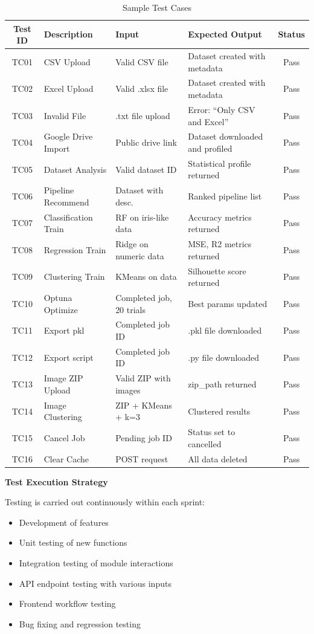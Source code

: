 \documentclass[12pt,a4paper]{report}
\begin{document}
\begin{table}[h]
\centering
\caption{Sample Test Cases}
\begin{tabular}{|c|p{3cm}|p{3cm}|p{3cm}|c|}
\hline
\textbf{Test ID} & \textbf{Description} & \textbf{Input} & \textbf{Expected Output} & \textbf{Status} \\
\hline
TC01 & CSV Upload & Valid CSV file & Dataset created with metadata & Pass \\
\hline
TC02 & Excel Upload & Valid .xlsx file & Dataset created with metadata & Pass \\
\hline
TC03 & Invalid File & .txt file upload & Error: ``Only CSV and Excel'' & Pass \\
\hline
TC04 & Google Drive Import & Public drive link & Dataset downloaded and profiled & Pass \\
\hline
TC05 & Dataset Analysis & Valid dataset ID & Statistical profile returned & Pass \\
\hline
TC06 & Pipeline Recommend & Dataset with desc. & Ranked pipeline list & Pass \\
\hline
TC07 & Classification Train & RF on iris-like data & Accuracy metrics returned & Pass \\
\hline
TC08 & Regression Train & Ridge on numeric data & MSE, R2 metrics returned & Pass \\
\hline
TC09 & Clustering Train & KMeans on data & Silhouette score returned & Pass \\
\hline
TC10 & Optuna Optimize & Completed job, 20 trials & Best params updated & Pass \\
\hline
TC11 & Export pkl & Completed job ID & .pkl file downloaded & Pass \\
\hline
TC12 & Export script & Completed job ID & .py file downloaded & Pass \\
\hline
TC13 & Image ZIP Upload & Valid ZIP with images & zip\_path returned & Pass \\
\hline
TC14 & Image Clustering & ZIP + KMeans + k=3 & Clustered results & Pass \\
\hline
TC15 & Cancel Job & Pending job ID & Status set to cancelled & Pass \\
\hline
TC16 & Clear Cache & POST request & All data deleted & Pass \\
\hline
\end{tabular}
\end{table}

\textbf{Test Execution Strategy}

Testing is carried out continuously within each sprint:
\begin{itemize}
    \item Development of features
    \item Unit testing of new functions
    \item Integration testing of module interactions
    \item API endpoint testing with various inputs
    \item Frontend workflow testing
    \item Bug fixing and regression testing
\end{itemize}
\end{document}
